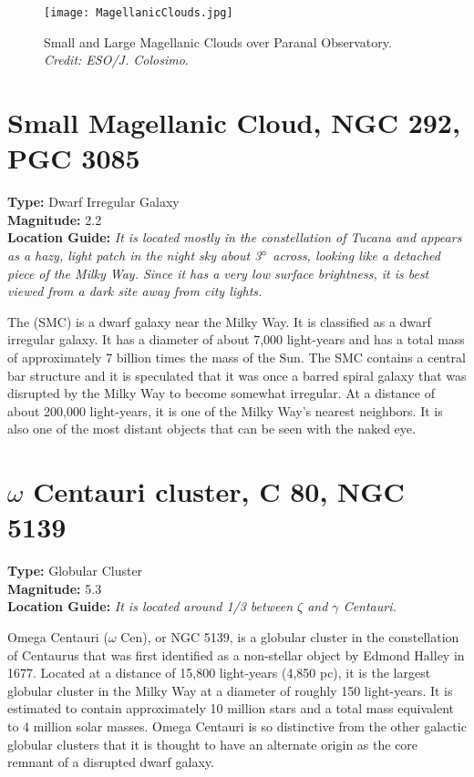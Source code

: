 \begin{figure}[ht]
\texttt{[image: MagellanicClouds.jpg]}
\caption{Small and Large Magellanic Clouds over Paranal Observatory. \emph{Credit: ESO/J. Colosimo}.}
\label{fig:MagellanicClouds}
\end{figure}

\section{Small Magellanic Cloud, NGC 292, PGC 3085}
\textbf{Type:} Dwarf Irregular Galaxy \\
\textbf{Magnitude:} 2.2 \\ 
\textbf{Location Guide:} \textit{It is located mostly in the constellation of Tucana and appears as a hazy, light patch in the night sky about 3$\degree$ across, looking like a detached piece of the Milky Way. Since it has a very low surface brightness, it is best viewed from a dark site away from city lights.}

The  (SMC) is a dwarf galaxy near the Milky Way. It is classified as a dwarf irregular galaxy. It has a diameter of about 7,000 light-years and has a total mass of approximately 7 billion times the mass of the Sun. The SMC contains a central bar structure and it is speculated that it was once a barred spiral galaxy that was disrupted by the Milky Way to become somewhat irregular. At a distance of about 200,000 light-years, it is one of the Milky Way's nearest neighbors. It is also one of the most distant objects that can be seen with the naked eye.

\section{\texorpdfstring{$\omega$}{omega} Centauri cluster, C 80, NGC 5139}
\textbf{Type:} Globular Cluster \\
\textbf{Magnitude:} 5.3 \\ 
\textbf{Location Guide:} \textit{It is located around 1/3 between $\zeta$ and $\gamma$ Centauri.}

Omega Centauri ($\omega$ Cen), or NGC 5139, is a globular cluster in the constellation of Centaurus that was first identified as a non-stellar object by Edmond Halley in 1677. Located at a distance of 15,800 light-years (4,850 pc), it is the largest globular cluster in the Milky Way at a diameter of roughly 150 light-years. It is estimated to contain approximately 10 million stars and a total mass equivalent to 4 million solar masses. Omega Centauri is so distinctive from the other galactic globular clusters that it is thought to have an alternate origin as the core remnant of a disrupted dwarf galaxy\cite{2008ApJ...676.1008N}.

